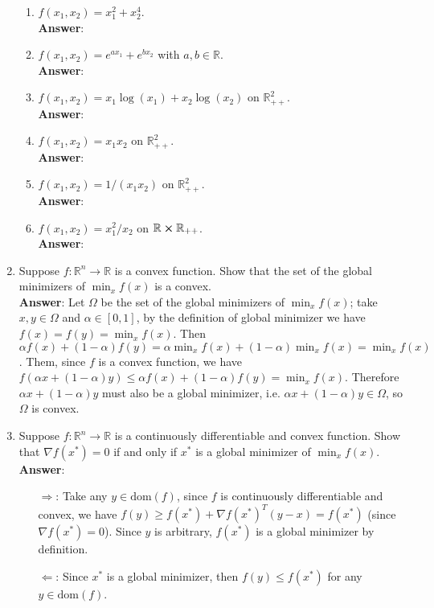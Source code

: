 \documentclass{article}
\begin{document}
\begin{enumerate}
            \begin{enumerate}
                  \item $f(x_1,x_2)=x_1^2+x_2^4$.\\
                        \textbf{Answer}:
                  \item $f(x_1,x_2)=e^{ax_1}+e^{bx_2}$ with $a,b\in\mathbb{R}$.\\
                        \textbf{Answer}:
                  \item $f(x_1,x_2)=x_1\log(x_1)+x_2\log(x_2)$ on $\mathbb{R}_{++}^2$.\\
                        \textbf{Answer}:
                  \item $f(x_1,x_2)=x_1x_2$ on $\mathbb{R}_{++}^2$.\\
                        \textbf{Answer}:
                  \item $f(x_1,x_2)=1/(x_1x_2)$ on $\mathbb{R}_{++}^2$.\\
                        \textbf{Answer}:
                  \item $f(x_1,x_2)=x_1^2/x_2$ on $\mathbb{R}\cross\mathbb{R}_{++}$.\\
                        \textbf{Answer}:
            \end{enumerate}
      \item Suppose $f:\mathbb{R}^n\rightarrow\mathbb{R}$ is a convex function. Show that the set of the global minimizers of $\min_xf(x)$ is a convex.\\
            \textbf{Answer}: Let $\Omega$ be the set of the global minimizers of $\min_xf(x)$; take $x,y\in\Omega$ and $\alpha\in[0,1]$, by the definition of global minimizer we have $f(x)=f(y)=\min_xf(x)$. Then $\alpha f(x)+(1-\alpha) f(y)=\alpha\min_xf(x)+(1-\alpha)\min_xf(x)=\min_xf(x)$. Them, since $f$ is a convex function, we have $f(\alpha x+(1-\alpha)y)\leq\alpha f(x)+(1-\alpha) f(y)=\min_xf(x)$. Therefore $\alpha x+(1-\alpha)y$ must also be a global minimizer, i.e. $\alpha x+(1-\alpha)y\in\Omega$, so $\Omega$ is convex.
      \item Suppose $f:\mathbb{R}^n\rightarrow\mathbb{R}$ is a continuously differentiable and convex function. Show that $\nabla f(x^*)=0$ if and only if $x^*$ is a global minimizer of $\min_xf(x)$.\\
            \textbf{Answer}:
            \begin{itemize}
                  \item [$\Rightarrow$:] Take any $y\in\text{dom}(f)$, since $f$ is continuously differentiable and convex, we have $f(y)\geq f(x^*)+\nabla f(x^*)^T(y-x)=f(x^*)$ (since $\nabla f(x^*)=0$). Since $y$ is arbitrary, $f(x^*)$ is a global minimizer by definition.
                  \item [$\Leftarrow$:] Since $x^*$ is a global minimizer, then $f(y)\leq f(x^*)$ for any $y\in\text{dom}(f)$.
            \end{itemize}
\end{enumerate}
\end{document}

